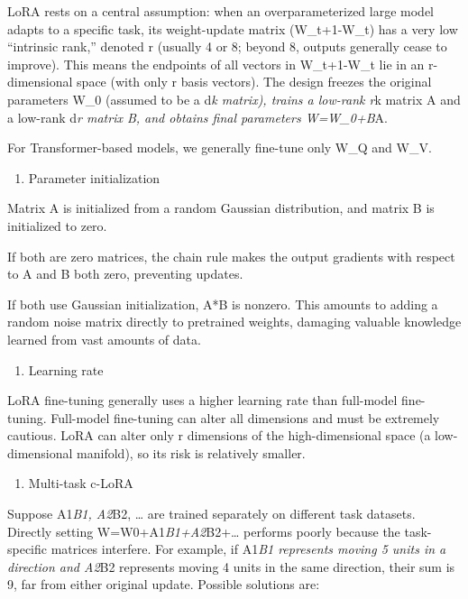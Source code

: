 LoRA rests on a central assumption: when an overparameterized large model adapts to a specific task, its weight-update matrix (W\_t+1-W\_t) has a very low ``intrinsic rank,'' denoted r (usually 4 or 8; beyond 8, outputs generally cease to improve). This means the endpoints of all vectors in W\_t+1-W\_t lie in an r-dimensional space (with only r basis vectors). The design freezes the original parameters W\_0 (assumed to be a d\emph{k matrix), trains a low-rank r}k matrix A and a low-rank d\emph{r matrix B, and obtains final parameters W=W\_0+B}A.

For Transformer-based models, we generally fine-tune only W\_Q and W\_V.

\begin{enumerate}
\def\labelenumi{(\arabic{enumi})}
\setcounter{enumi}{1}
\tightlist
\item
  Parameter initialization
\end{enumerate}

Matrix A is initialized from a random Gaussian distribution, and matrix B is initialized to zero.

If both are zero matrices, the chain rule makes the output gradients with respect to A and B both zero, preventing updates.

If both use Gaussian initialization, A*B is nonzero. This amounts to adding a random noise matrix directly to pretrained weights, damaging valuable knowledge learned from vast amounts of data.

\begin{enumerate}
\def\labelenumi{(\arabic{enumi})}
\setcounter{enumi}{2}
\tightlist
\item
  Learning rate
\end{enumerate}

LoRA fine-tuning generally uses a higher learning rate than full-model fine-tuning. Full-model fine-tuning can alter all dimensions and must be extremely cautious. LoRA can alter only r dimensions of the high-dimensional space (a low-dimensional manifold), so its risk is relatively smaller.

\begin{enumerate}
\def\labelenumi{(\arabic{enumi})}
\setcounter{enumi}{3}
\tightlist
\item
  Multi-task c-LoRA
\end{enumerate}

Suppose A1\emph{B1, A2}B2, \ldots{} are trained separately on different task datasets. Directly setting W=W0+A1\emph{B1+A2}B2+\ldots{} performs poorly because the task-specific matrices interfere. For example, if A1\emph{B1 represents moving 5 units in a direction and A2}B2 represents moving 4 units in the same direction, their sum is 9, far from either original update. Possible solutions are:


